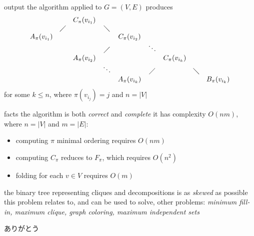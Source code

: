 \documentclass{beamer}
\begin{document}
\begin{frame}{output}
the algorithm applied to $G=(V,E)$ produces
\begin{displaymath}
\begin{array}{ccccccccc}
                   &         & C_{\pi}(v_{i_{1}})   &                                   \\
                   & \diagup &                      & \diagdown                         \\
A_{\pi}(v_{i_{1}}) &         &                      &           & C_{\pi}(v_{i_{2}})    \\
                   &         &                      & \diagup   &                       & \ddots   \\
                   &         & A_{\pi}(v_{i_{2}})   &           &                       &           & C_{\pi}(v_{i_{k}})  \\
                   &         &                      & \ddots    &                       & \diagup   &                   & \diagdown  \\
                   &         &                      &           & A_{\pi}(v_{i_{k}})    &           &                   &           & B_{\pi}(v_{i_{k}})   \\
\end{array}
\end{displaymath}
for some $k\leq n$, where $\pi(v_{i_{j}})=j$ and $n=|V|$
\end{frame}

\begin{frame}{facts}
the algorithm is both \textit{correct} and \textit{complete}
\vfill
it has complexity $O(nm)$, where $n=|V|$ and $m=|E|$:
\begin{itemize}
    \item computing $\pi$ minimal ordering requires $O(nm)$
    \item computing $C_{\pi}$ reduces to $F_{\pi}$, which requires $O(n^{2})$
    \item folding for each $v\in V$ requires $O(m)$
\end{itemize}
\vfill
the binary tree representing cliques and decompositions is as \textit{skewed} as possible
\vfill
this problem relates to, and can be used to solve, other problems:
\textit{minimum fill-in, maximum clique, graph coloring, maximum independent sets}
\end{frame}
  

\begin{frame}{ }
\Huge
\begin{CJK}{UTF8}{min}
ありがとう
\end{CJK}
\end{frame}
\end{document}
